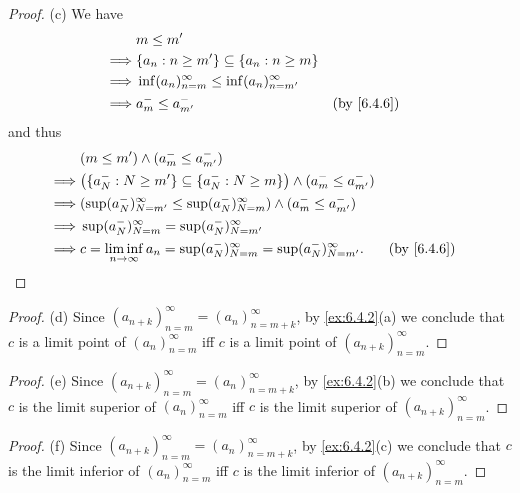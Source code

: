 \begin{proof}{(c)}
  We have
  \begin{align*}
             & m \leq m'                                                               \\
    \implies & \{a_n : n \geq m'\} \subseteq \{a_n : n \geq m\}                        \\
    \implies & \inf(a_n)_{n = m}^\infty \leq \inf(a_n)_{n = m'}^\infty                 \\
    \implies & a_m^- \leq a_{m'}^-                                     &  & \by{6.4.6}
  \end{align*}
  and thus
  \begin{align*}
             & (m \leq m') \land (a_m^- \leq a_{m'}^-)                                                                    \\
    \implies & \big(\{a_N^- : N \geq m'\} \subseteq \{a_N^- : N \geq m\}\big) \land (a_m^- \leq a_{m'}^-)                 \\
    \implies & (\sup(a_N^-)_{N = m'}^\infty \leq \sup(a_N^-)_{N = m}^\infty) \land (a_m^- \leq a_{m'}^-)                  \\
    \implies & \sup(a_N^-)_{N = m}^\infty = \sup(a_N^-)_{N = m'}^\infty                                                   \\
    \implies & c = \liminf_{n \to \infty} a_n = \sup(a_N^-)_{N = m}^\infty = \sup(a_N^-)_{N = m'}^\infty. &  & \by{6.4.6}
  \end{align*}
\end{proof}

\begin{proof}{(d)}
  Since \((a_{n + k})_{n = m}^\infty = (a_n)_{n = m + k}^\infty\), by \cref{ex:6.4.2}(a) we conclude that \(c\) is a limit point of \((a_n)_{n = m}^\infty\) iff \(c\) is a limit point of \((a_{n + k})_{n = m}^\infty\).
\end{proof}

\begin{proof}{(e)}
  Since \((a_{n + k})_{n = m}^\infty = (a_n)_{n = m + k}^\infty\), by \cref{ex:6.4.2}(b) we conclude that \(c\) is the limit superior of \((a_n)_{n = m}^\infty\) iff \(c\) is the limit superior of \((a_{n + k})_{n = m}^\infty\).
\end{proof}

\begin{proof}{(f)}
  Since \((a_{n + k})_{n = m}^\infty = (a_n)_{n = m + k}^\infty\), by \cref{ex:6.4.2}(c) we conclude that \(c\) is the limit inferior of \((a_n)_{n = m}^\infty\) iff \(c\) is the limit inferior of \((a_{n + k})_{n = m}^\infty\).
\end{proof}

